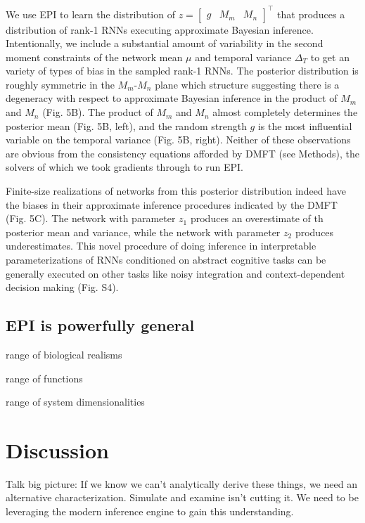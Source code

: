 \documentclass[11pt]{article}
\begin{document}
We use EPI to learn the distribution of $z = \begin{bmatrix} g & M_m & M_n \end{bmatrix}^\top$ that produces a distribution of rank-1 RNNs executing approximate Bayesian inference. 
Intentionally, we include a substantial amount of variability in the second moment constraints of the network mean $\mu$ and temporal variance $\Delta_T$ to get an variety of types of bias in the sampled rank-1 RNNs.  
The posterior distribution is roughly symmetric in the $M_m$-$M_n$ plane which structure suggesting there is a degeneracy with respect to approximate Bayesian inference in the product of $M_m$ and $M_n$ (Fig. 5B).  
The product of $M_m$ and $M_n$ almost completely determines the posterior mean (Fig. 5B, left), and the random strength $g$ is the most influential variable on the temporal variance (Fig. 5B, right). 
 Neither of these observations are obvious from the consistency equations afforded by DMFT (see Methods), the solvers of which we took gradients through to run EPI.  
 
Finite-size realizations of networks from this posterior distribution indeed have the biases in their approximate inference procedures indicated by the DMFT (Fig. 5C). The network with parameter $z_1$ produces an overestimate of th  posterior mean and variance, while the network with parameter $z_2$ produces underestimates.  This novel procedure of doing inference in interpretable parameterizations of RNNs conditioned on abstract cognitive tasks can be generally executed on other tasks like noisy integration and context-dependent decision making (Fig. S4).

\subsection{EPI is powerfully general}
range of biological realisms

range of functions

range of system dimensionalities

\section{Discussion}

 Talk big picture: If we know we can't analytically derive these things, we need an alternative characterization.  Simulate and examine isn't cutting it.  We need to be leveraging the modern inference engine to gain this understanding.  
\end{document}
